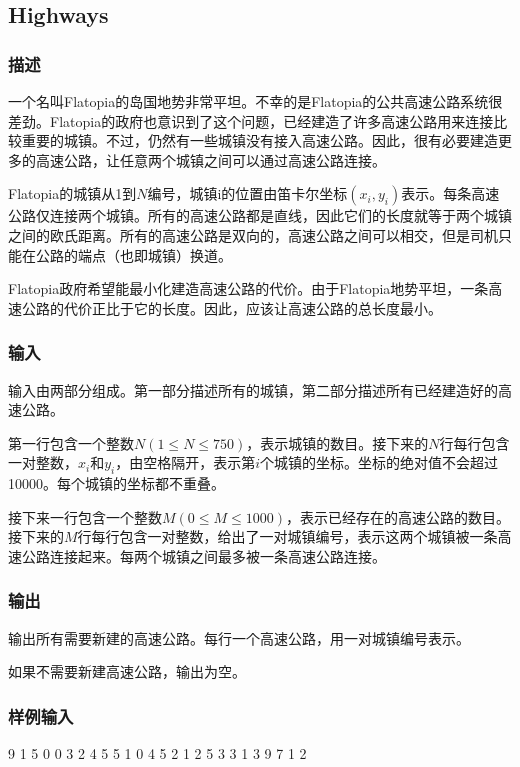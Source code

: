 \subsection{Highways}
\subsubsection{描述}
一个名叫Flatopia的岛国地势非常平坦。不幸的是Flatopia的公共高速公路系统很差劲。Flatopia的政府也意识到了这个问题，已经建造了许多高速公路用来连接比较重要的城镇。不过，仍然有一些城镇没有接入高速公路。因此，很有必要建造更多的高速公路，让任意两个城镇之间可以通过高速公路连接。

Flatopia的城镇从1到$N$编号，城镇i的位置由笛卡尔坐标$(x_i,y_i)$表示。每条高速公路仅连接两个城镇。所有的高速公路都是直线，因此它们的长度就等于两个城镇之间的欧氏距离。所有的高速公路是双向的，高速公路之间可以相交，但是司机只能在公路的端点（也即城镇）换道。

Flatopia政府希望能最小化建造高速公路的代价。由于Flatopia地势平坦，一条高速公路的代价正比于它的长度。因此，应该让高速公路的总长度最小。

\subsubsection{输入}
输入由两部分组成。第一部分描述所有的城镇，第二部分描述所有已经建造好的高速公路。

第一行包含一个整数$N(1 \leq N \leq 750)$，表示城镇的数目。接下来的$N$行每行包含一对整数，$x_i$和$y_i$，由空格隔开，表示第$i$个城镇的坐标。坐标的绝对值不会超过10000。每个城镇的坐标都不重叠。

接下来一行包含一个整数$M(0 \leq M \leq 1000)$，表示已经存在的高速公路的数目。接下来的$M$行每行包含一对整数，给出了一对城镇编号，表示这两个城镇被一条高速公路连接起来。每两个城镇之间最多被一条高速公路连接。

\subsubsection{输出}
输出所有需要新建的高速公路。每行一个高速公路，用一对城镇编号表示。

如果不需要新建高速公路，输出为空。

\subsubsection{样例输入}
\begin{Code}
9
1 5
0 0 
3 2
4 5
5 1
0 4
5 2
1 2
5 3
3
1 3
9 7
1 2
\end{Code}

